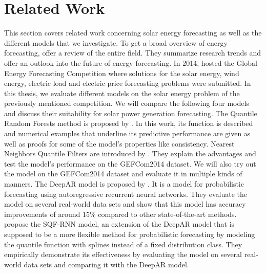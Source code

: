 \section{Related Work}
\label{sec:related-work}

This section covers related work concerning solar energy forecasting as well as 
the different models that we investigate. 
To get a broad overview of energy forecasting, 
\Textcite{Hong2020} offer a review of the entire field. 
They summarize research trends and offer an outlook into the future of energy forecasting. 
In 2014, \Textcite{Hong2016} hosted the Global Energy Forecasting Competition where 
solutions for the solar energy, wind energy, electric load and electric price forecasting 
problems were submitted. 
In this thesis, we evaluate different models on the solar energy problem 
of the previously mentioned competition. We will compare the following four models 
and discuss their suitability for solar power generation forecasting. 
The Quantile Random Forests method is proposed by \Textcite{Meinshausen2006}. 
In this work, its function is described 
and numerical examples that underline its predictive performance are given 
as well as proofs for some of the model's properties like consistency. 
Nearest Neighbors Quantile Filters are introduced by \Textcite{Ordiano2019}. 
They explain the advantages and test the model's performance on the GEFCom2014 dataset. 
We will also try out the model on the GEFCom2014 dataset and evaluate 
it in multiple kinds of manners.
The DeepAR model is proposed by \Textcite{Salinas2017}. 
It is a model for probabilistic forecasting using autoregressive recurrent neural networks. 
They evaluate the model on several 
real-world data sets and show that this model has accuracy improvements of around 
\(15\%\) compared to other state-of-the-art methods. 
\Textcite{Gasthaus2019} propose the SQF-RNN model, an extension of the DeepAR model 
that is supposed to be a more flexible method for probabilistic forecasting 
by modeling the quantile function with splines instead of a fixed distribution class.
They empirically demonstrate its effectiveness by evaluating the model on several real-world 
data sets and comparing it with the DeepAR model.